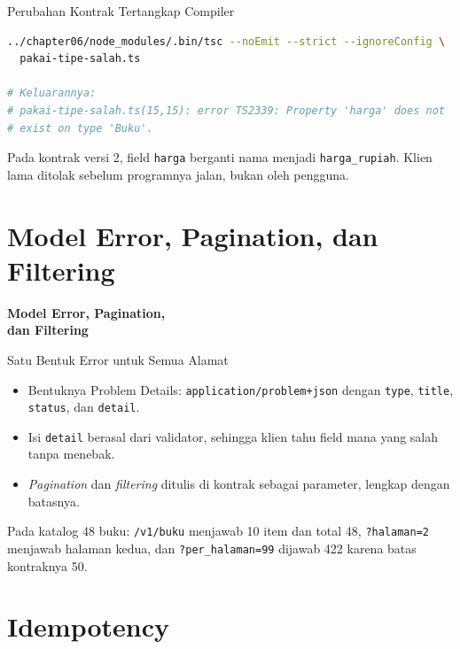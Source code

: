 \documentclass[aspectratio=169, table, 12pt]{beamer}
\begin{document}
\begin{frame}[fragile]{{\Large Perubahan Kontrak Tertangkap Compiler}}
  \vspace{2pt}
\begin{lstlisting}[language=bash]
../chapter06/node_modules/.bin/tsc --noEmit --strict --ignoreConfig \
  pakai-tipe-salah.ts

# Keluarannya:
# pakai-tipe-salah.ts(15,15): error TS2339: Property 'harga' does not
# exist on type 'Buku'.
\end{lstlisting}
  \vspace{4pt}
  {\small Pada kontrak versi 2, field \texttt{harga} berganti nama menjadi
  \texttt{harga\_rupiah}. Klien lama ditolak sebelum programnya jalan, bukan
  oleh pengguna.}
\end{frame}

\section{Model Error, Pagination, dan Filtering}

\begin{frame}{\hfill}
  \centering
  \Huge{\textbf{Model Error, Pagination,\\dan Filtering}}
\end{frame}

\begin{frame}{{\Large Satu Bentuk Error untuk Semua Alamat}}
  \vspace{10pt}
  \begin{itemize}
    \item Bentuknya Problem Details:
          \texttt{application/problem+json} dengan \texttt{type},
          \texttt{title}, \texttt{status}, dan \texttt{detail}.
    \item Isi \texttt{detail} berasal dari validator, sehingga klien tahu
          field mana yang salah tanpa menebak.
    \item \textit{Pagination} dan \textit{filtering} ditulis di kontrak
          sebagai parameter, lengkap dengan batasnya.
  \end{itemize}
  \vspace{8pt}
  {\small Pada katalog 48 buku: \texttt{/v1/buku} menjawab 10 item dan total
  48, \texttt{?halaman=2} menjawab halaman kedua, dan
  \texttt{?per\_halaman=99} dijawab 422 karena batas kontraknya 50.}
\end{frame}

\section{Idempotency}
\end{document}
